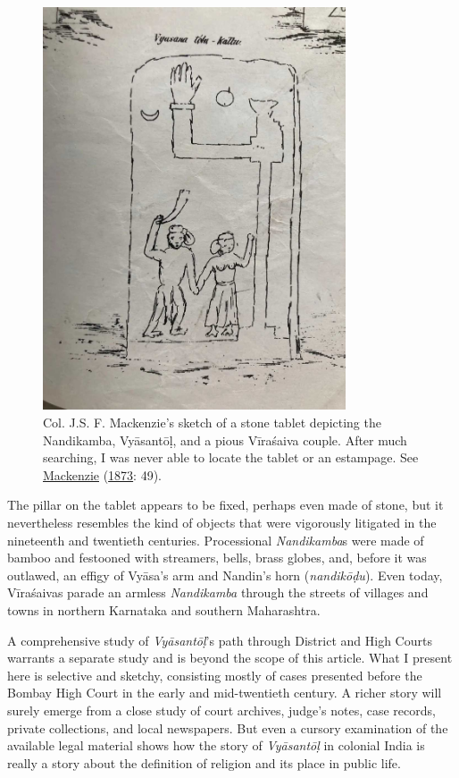 \begin{figure}[ht!]\label{fig4}\centering

\includegraphics[width=0.8\textwidth]{images/figure-04.jpg}
\caption{Col. J.\thinskip{}S. F. Mackenzie’s sketch of a stone tablet depicting the Nandikamba, Vyāsantōḷ, and a pious Vīraśaiva couple. After much searching, I was never able to locate the tablet or an estampage. See \hyperref[Mackenzie1873]{Mackenzie} (\hyperref[Mackenzie1873]{1873}: 49).}

\end{figure}


The pillar on the tablet appears to be fixed, perhaps even made of stone, but it nevertheless resembles the kind of objects that were vigorously litigated in the nineteenth and twentieth centuries. Processional \emph{{Nandikamba}}s were made of bamboo and festooned with streamers, bells, brass globes, and, before it was outlawed, an effigy of Vyāsa’s arm and Nandin’s horn (\emph{nandikōḍu}). Even today, Vīraśaivas parade an armless \emph{{Nandikamba}} through the streets of villages and towns in northern Karnataka and southern Maharashtra.


A comprehensive study of \emph{Vyāsantōḷ}’s path through District and High Courts warrants a separate study and is beyond the scope of this article. What I present here is selective and sketchy, consisting mostly of cases presented before the Bombay High Court in the early and mid-twentieth century. A richer story will surely emerge from a close study of court archives, judge’s notes, case records, private collections, and local newspapers. But even a cursory examination of the available legal material shows how the story of \emph{Vyāsantōḷ} in colonial India is really a story about the definition of religion and its place in public life.


